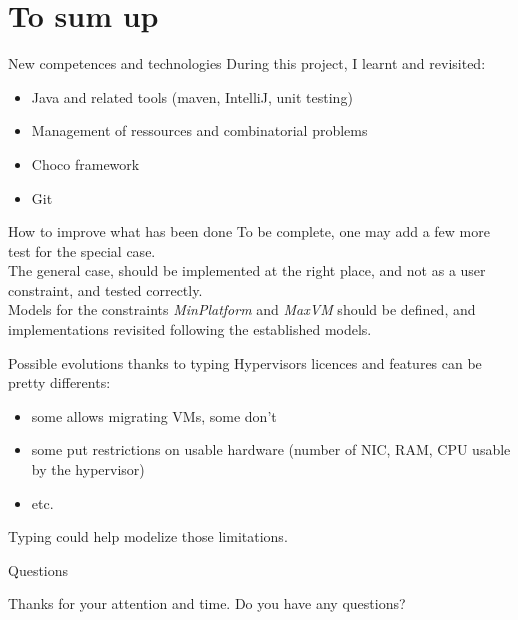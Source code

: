 \documentclass{beamer}
\begin{document}
\section{To sum up}
\begin{frame}{New competences and technologies}
During this project, I learnt and revisited:
\begin{itemize}
	\item Java and related tools (maven, IntelliJ, unit testing)
	\item Management of ressources and combinatorial problems
	\item Choco framework
	\item Git
\end{itemize}
\end{frame}
\begin{frame}{How to improve what has been done}
To be complete, one may add a few more test for the special case.\\
\pause The general case, should be implemented at the right place, and not
as a user constraint, and tested correctly.\\
\pause Models for the constraints \textit{MinPlatform} and \textit{MaxVM}
should be defined, and implementations revisited following the established
models. 
\end{frame}
\begin{frame}{Possible evolutions thanks to typing}
Hypervisors licences and features can be pretty differents:
\begin{itemize}
	\item some allows migrating VMs, some don't
	\item some put restrictions on usable hardware (number of NIC, RAM, CPU usable
		by the hypervisor)
	\item etc.
\end{itemize}
Typing could help modelize those limitations.
\end{frame}

\begin{frame}{Questions}
\begin{center}
Thanks for your attention and time. Do you have any questions?
\end{center}
\end{frame}

\end{document}
